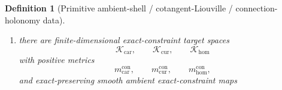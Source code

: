 \documentclass[11pt]{article}
\newcommand{\TensorSeedSpace}{\mathcal B_{\mathrm{car}}}
\newcommand{\CurSeedSpace}{\mathcal B_{\mathrm{cur}}}
\newcommand{\HomSeedSpace}{\mathcal B_{\mathrm{hom}}}
\newcommand{\TensorConstraintTarget}{\mathcal K_{\mathrm{car}}}
\newcommand{\CurConstraintTarget}{\mathcal K_{\mathrm{cur}}}
\newcommand{\HomConstraintTarget}{\mathcal K_{\mathrm{hom}}}
\newcommand{\TensorConstraintMetric}{m_{\mathrm{car}}^{\mathrm{con}}}
\newcommand{\CurConstraintMetric}{m_{\mathrm{cur}}^{\mathrm{con}}}
\newcommand{\HomConstraintMetric}{m_{\mathrm{hom}}^{\mathrm{con}}}
\newcommand{\TensorAmbientSpace}{\mathcal X_{\mathrm{car}}}
\newcommand{\CurAmbientSpace}{\mathcal X_{\mathrm{cur}}}
\newcommand{\HomAmbientSpace}{\mathcal X_{\mathrm{hom}}}
\newcommand{\TensorAmbientMetric}{M_{\mathrm{car}}}
\newcommand{\CurAmbientMetric}{M_{\mathrm{cur}}}
\newcommand{\HomAmbientMetric}{M_{\mathrm{hom}}}
\newcommand{\TensorShellMetric}{m_{\mathrm{car}}^{\mathrm{sh}}}
\newcommand{\CurShellMetric}{m_{\mathrm{cur}}^{\mathrm{sh}}}
\newcommand{\HomShellMetric}{m_{\mathrm{hom}}^{\mathrm{sh}}}
\newcommand{\TensorShellSection}{\mathfrak D_{\mathrm{car}}}
\newcommand{\CurShellSection}{\mathfrak D_{\mathrm{cur}}}
\newcommand{\HomShellSection}{\mathfrak D_{\mathrm{hom}}}
\newcommand{\TensorShellGap}{\eta_{\mathrm{car}}}
\newcommand{\CurShellGap}{\eta_{\mathrm{cur}}}
\newcommand{\HomShellGap}{\eta_{\mathrm{hom}}}
\newcommand{\TensorSeedInc}{\iota_{\mathrm{car}}^{\mathrm{seed}}}
\newcommand{\CurSeedInc}{\iota_{\mathrm{cur}}^{\mathrm{seed}}}
\newcommand{\HomSeedInc}{\iota_{\mathrm{hom}}^{\mathrm{seed}}}
\newtheorem{definition}{Definition}
\begin{document}
\begin{definition}[Primitive ambient-shell / cotangent-Liouville / connection-holonomy data]
\begin{enumerate}
    Define the recorded seed spaces as the exact shell loci
    \begin{equation}
    \TensorSeedSpace\equiv\TensorShellSection^{-1}(0),\qquad
    \CurSeedSpace\equiv\CurShellSection^{-1}(0),\qquad
    \HomSeedSpace\equiv\HomShellSection^{-1}(0).
    \label{eq:seed_shells}
    \end{equation}
    Let
    \begin{equation}
    \TensorSeedInc:\TensorSeedSpace\hookrightarrow\TensorAmbientSpace,\qquad
    \CurSeedInc:\CurSeedSpace\hookrightarrow\CurAmbientSpace,\qquad
    \HomSeedInc:\HomSeedSpace\hookrightarrow\HomAmbientSpace
    \label{eq:seed_inclusions}
    \end{equation}
    be the shell inclusions. Assume these shells are closed embedded \(C^2\) submanifolds, invariant under the corresponding ambient time reversals, and containing the images of the corresponding ambient unit sections. Assume further that for every \(a\in\TensorSeedSpace\), \(b\in\CurSeedSpace\), \(c\in\HomSeedSpace\),
    \begin{equation}
    \TensorShellMetric\!\left(D\TensorShellSection(a)\xi,D\TensorShellSection(a)\xi\right)
    \ge
    \TensorShellGap\,\TensorAmbientMetric(\xi,\xi),
    \qquad
    \TensorShellGap>0,
    \label{eq:shell_gap_car}
    \end{equation}
    \begin{equation}
    \CurShellMetric\!\left(D\CurShellSection(b)\eta,D\CurShellSection(b)\eta\right)
    \ge
    \CurShellGap\,\CurAmbientMetric(\eta,\eta),
    \qquad
    \CurShellGap>0,
    \label{eq:shell_gap_cur}
    \end{equation}
    \begin{equation}
    \HomShellMetric\!\left(D\HomShellSection(c)\zeta,D\HomShellSection(c)\zeta\right)
    \ge
    \HomShellGap\,\HomAmbientMetric(\zeta,\zeta),
    \qquad
    \HomShellGap>0,
    \label{eq:shell_gap_hom}
    \end{equation}
    for all vectors \(\xi,\eta,\zeta\) orthogonal, with respect to the corresponding ambient metrics, to the tangent spaces of the corresponding shell loci.
    \item there are finite-dimensional exact-constraint target spaces
    \[
    \TensorConstraintTarget,\qquad
    \CurConstraintTarget,\qquad
    \HomConstraintTarget
    \]
    with positive metrics
    \[
    \TensorConstraintMetric,\qquad
    \CurConstraintMetric,\qquad
    \HomConstraintMetric,
    \]
    and exact-preserving smooth ambient exact-constraint maps

\end{enumerate}
\end{definition}
\end{document}
